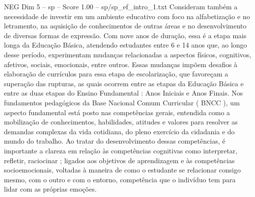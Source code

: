 \begin{textsample}{NEG Dim 5 – sp – Score 1.00 – sp/sp\_ef\_intro\_1.txt}
Consideram também a necessidade de investir em um ambiente educativo com foco na alfabetização e no letramento, na aquisição de conhecimentos de outras áreas e no desenvolvimento de diversas formas de expressão.
Com nove anos de duração, essa é a etapa mais longa da Educação Básica, atendendo estudantes entre 6 e 14 anos que, ao longo desse período, experimentam mudanças relacionadas a aspectos físicos, cognitivos, afetivos, sociais, emocionais, entre outros.
Essas mudanças impõem desafios à elaboração de currículos para essa etapa de escolarização, que favoreçam a superação das rupturas, as quais ocorrem entre as etapas da Educação Básica e entre as duas etapas do Ensino Fundamental : Anos Iniciais e Anos Finais.
Nos fundamentos pedagógicos da Base Nacional Comum Curricular ( BNCC ), um aspecto fundamental está posto nas competências gerais, entendida como a mobilização de conhecimentos, habilidades, atitudes e valores para resolver as demandas complexas da vida cotidiana, do pleno exercício da cidadania e do mundo do trabalho.
Ao tratar do desenvolvimento dessas competências, é importante a clareza em relação às competências cognitivas como interpretar, refletir, raciocinar ; ligados aos objetivos de aprendizagem e às competências socioemocionais, voltadas à maneira de como o estudante se relacionar consigo mesmo, com o outro e com o entorno, competência que o indivíduo tem para lidar com as próprias emoções.

\end{textsample}
